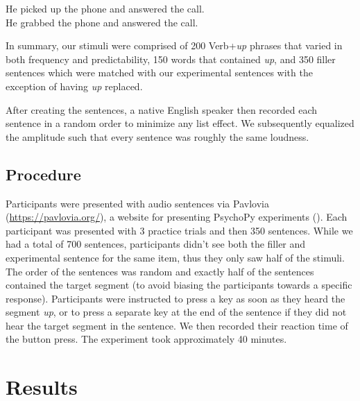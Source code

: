 \documentclass[
  12pt,
  letterpaper,
]{scrreport}
\begin{document}
\begin{exe} 
\ex
  \begin{xlist}
  \begin{singlespace}
    \ex He picked up the phone and answered the call. \\
    \ex He grabbed the phone and answered the call. \\
  \end{singlespace}
  \end{xlist}
\end{exe}

In summary, our stimuli were comprised of 200 Verb+\emph{up} phrases
that varied in both frequency and predictability, 150 words that
contained \emph{up}, and 350 filler sentences which were matched with
our experimental sentences with the exception of having \emph{up}
replaced.

After creating the sentences, a native English speaker then recorded
each sentence in a random order to minimize any list effect. We
subsequently equalized the amplitude such that every sentence was
roughly the same loudness.

\subsection{Procedure}\label{procedure-3}

Participants were presented with audio sentences via Pavlovia
(\url{https://pavlovia.org/}), a website for presenting PsychoPy
experiments ().
Each participant was presented with 3 practice trials and then 350
sentences. While we had a total of 700 sentences, participants didn't
see both the filler and experimental sentence for the same item, thus
they only saw half of the stimuli. The order of the sentences was random
and exactly half of the sentences contained the target segment (to avoid
biasing the participants towards a specific response). Participants were
instructed to press a key as soon as they heard the segment \emph{up},
or to press a separate key at the end of the sentence if they did not
hear the target segment in the sentence. We then recorded their reaction
time of the button press. The experiment took approximately 40 minutes.

\section{Results}\label{results-4}
\end{document}
